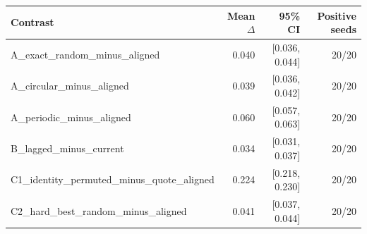 \begin{tabular}{lrrr}
\toprule
Contrast & Mean $\Delta$ & 95\% CI & Positive seeds \\ 
\midrule
A\_exact\_random\_minus\_aligned & 0.040 & [0.036, 0.044] & 20/20 \\
A\_circular\_minus\_aligned & 0.039 & [0.036, 0.042] & 20/20 \\
A\_periodic\_minus\_aligned & 0.060 & [0.057, 0.063] & 20/20 \\
B\_lagged\_minus\_current & 0.034 & [0.031, 0.037] & 20/20 \\
C1\_identity\_permuted\_minus\_quote\_aligned & 0.224 & [0.218, 0.230] & 20/20 \\
C2\_hard\_best\_random\_minus\_aligned & 0.041 & [0.037, 0.044] & 20/20 \\
\bottomrule
\end{tabular}
